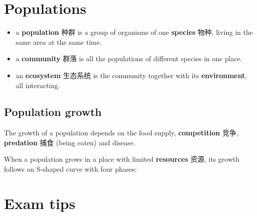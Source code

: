 \documentclass[11pt]{article}
\begin{document}
\section*{Populations}

\begin{itemize}
\item a \textbf{population} 种群 is a group of organisms of one \textbf{species} 物种, living in the same area at the same time.

\item a \textbf{community} 群落 is all the populations of different species in one place.

\item an \textbf{ecosystem} 生态系统 is the community together with its \textbf{environment}, all interacting.

\end{itemize}

\subsection*{Population growth}

The growth of a population depends on the food supply, \textbf{competition} 竞争, \textbf{predation} 捕食 (being eaten) and disease.

When a population grows in a place with limited \textbf{resources} 资源, its growth follows an S-shaped curve with four phases:

\begin{center}
\end{center}

\section*{Exam tips}
\end{document}
